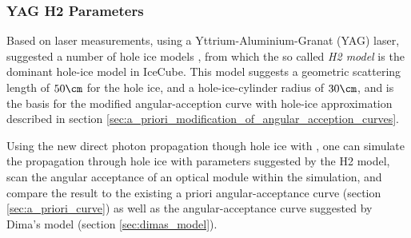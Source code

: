 %
%
%
%
%
%
\subsubsection{YAG H2 Parameters}
Based on laser measurements, using a Yttrium-Aluminium-Granat (YAG) laser,  suggested a number of hole ice models \cite{holeicestudieswithyag}, from which the so called \textit{H2 model} is the dominant hole-ice model in IceCube. This model suggests a geometric scattering length of $50\cm$ for the hole ice, and a hole-ice-cylinder radius of $30\cm$, and is the basis for the modified angular-acception curve with hole-ice approximation described in section \ref{sec:a_priori_modification_of_angular_acception_curves}.

Using the new direct photon propagation though hole ice with \clsim, one can simulate the propagation through hole ice with parameters suggested by the H2 model, scan the angular acceptance of an optical module within the simulation, and compare the result to the existing a priori angular-acceptance curve (section \ref{sec:a_priori_curve}) as well as the angular-acceptance curve suggested by Dima's model (section \ref{sec:dimas_model}).

